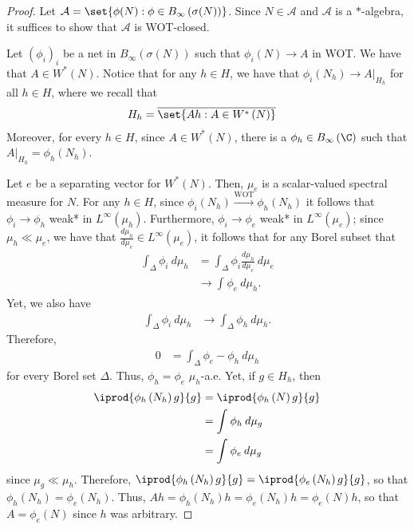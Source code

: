 \documentclass[10pt]{mypackage}
\begin{document}
\begin{proof}
  Let $\mathcal{A} = \set{\phi(N) : \phi\in B_{\infty}\left( \sigma(N) \right)}$. Since $N\in \mathcal{A}$ and $\mathcal{A}$ is a $\ast$-algebra, it suffices to show that $\mathcal{A}$ is WOT-closed.

  Let $\left( \phi_i \right)_i$ be a net in $B_{\infty}\left( \sigma(N) \right)$ such that $\phi_i(N)\to A$ in WOT. We have that $A\in W^{\ast}\left( N \right)$. Notice that for any $h\in H$, we have that $\phi_i\left( N_h \right)\to A|_{H_h}$ for all $h\in H$, where we recall that
  \begin{align*}
    H_h &= \overline{\set{Ah : A\in W^{\ast}\left( N \right)}}
  \end{align*}
  Moreover, for every $h\in H$, since $A\in W^{\ast}\left( N \right)$, there is a $\phi_h\in B_{\infty}\left( \C \right)$ such that $A|_{H_h} = \phi_h\left( N_h \right)$.

  Let $e$ be a separating vector for $W^{\ast}\left( N \right)$. Then, $\mu_e$ is a scalar-valued spectral measure for $N$. For any $h\in H$, since $\phi_i\left( N_h \right)\xrightarrow{\text{WOT}} \phi_h\left( N_h \right)$ it follows that $\phi_i\to \phi_h$ weak* in $L^{\infty}\left( \mu_h \right)$. Furthermore, $\phi_i\to \phi_e$ weak* in $L^{\infty}\left( \mu_e \right)$; since $\mu_h\ll \mu_e$, we have that $\frac{d\mu_h}{d\mu_e}\in L^{\infty}\left( \mu_e \right)$, it follows that for any Borel subset that
  \begin{align*}
    \int_{\Delta}^{} \phi_i\:d\mu_h &= \int_{\Delta}^{} \phi_i \frac{d\mu_h}{d\mu_e}\:d\mu_e\\
                                    &\to \int_{}^{} \phi_e\:d\mu_h.
  \end{align*}
  Yet, we also have
  \begin{align*}
    \int_{\Delta}^{} \phi_i\:d\mu_h &\to \int_{\Delta}^{} \phi_h\:d\mu_h.
  \end{align*}
  Therefore,
  \begin{align*}
    0 &= \int_{\Delta}^{} \phi_e-\phi_h\:d\mu_h
  \end{align*}
  for every Borel set $\Delta$. Thus, $\phi_h =\phi_e$ $\mu_h$-a.e. Yet, if $g\in H_h$, then
  \begin{align*}
    \iprod{\phi_h\left( N_h \right)g}{g} &= \iprod{\phi_h\left( N \right)g}{g}\\
                                         &= \int_{}^{} \phi_h\:d\mu_g\\
                                         &= \int_{}^{} \phi_e\:d\mu_g
  \end{align*}
  since $\mu_g\ll \mu_h$. Therefore, $ \iprod{\phi_h\left( N_h \right)g}{g} = \iprod{\phi_e\left( N_h \right)g}{g} $, so that $\phi_h\left( N_h \right) = \phi_e\left( N_h \right)$. Thus, $Ah = \phi_h\left( N_h \right)h = \phi_e\left( N_h \right)h = \phi_e\left( N \right)h$, so that $A = \phi_e\left( N \right)$ since $h$ was arbitrary.
\end{proof}
\end{document}
